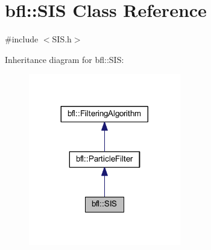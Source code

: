 \hypertarget{classbfl_1_1SIS}{}\section{bfl\+:\+:S\+IS Class Reference}
\label{classbfl_1_1SIS}


{\ttfamily \#include $<$S\+I\+S.\+h$>$}



Inheritance diagram for bfl\+:\+:S\+IS\+:
\nopagebreak
\begin{figure}[H]
\begin{center}
\leavevmode
\includegraphics[width=188pt]{classbfl_1_1SIS__inherit__graph}
\end{center}
\end{figure}
